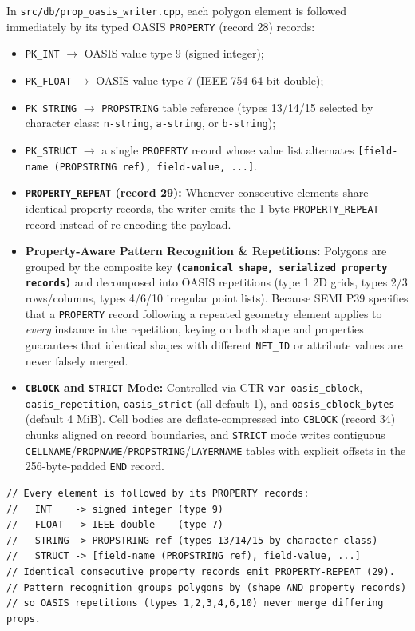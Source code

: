 In \texttt{src/db/prop\_oasis\_writer.cpp}, each polygon element is followed immediately by its typed OASIS \texttt{PROPERTY} (record 28) records:
\begin{itemize}
  \item \texttt{PK\_INT} $\to$ OASIS value type 9 (signed integer);
  \item \texttt{PK\_FLOAT} $\to$ OASIS value type 7 (IEEE-754 64-bit double);
  \item \texttt{PK\_STRING} $\to$ \texttt{PROPSTRING} table reference (types 13/14/15 selected by character class: \texttt{n-string}, \texttt{a-string}, or \texttt{b-string});
  \item \texttt{PK\_STRUCT} $\to$ a single \texttt{PROPERTY} record whose value list alternates \texttt{[field-name (PROPSTRING ref), field-value, ...]}.
  \item \textbf{\texttt{PROPERTY\_REPEAT} (record 29):} Whenever consecutive elements share identical property records, the writer emits the 1-byte \texttt{PROPERTY\_REPEAT} record instead of re-encoding the payload.
  \item \textbf{Property-Aware Pattern Recognition \& Repetitions:} Polygons are grouped by the composite key \textbf{\texttt{(canonical shape, serialized property records)}} and decomposed into OASIS repetitions (type 1 2D grids, types 2/3 rows/columns, types 4/6/10 irregular point lists). Because SEMI P39 specifies that a \texttt{PROPERTY} record following a repeated geometry element applies to \emph{every} instance in the repetition, keying on both shape and properties guarantees that identical shapes with different \texttt{NET\_ID} or attribute values are never falsely merged.
  \item \textbf{\texttt{CBLOCK} and \texttt{STRICT} Mode:} Controlled via CTR \texttt{var oasis\_cblock}, \texttt{oasis\_repetition}, \texttt{oasis\_strict} (all default 1), and \texttt{oasis\_cblock\_bytes} (default 4 MiB). Cell bodies are deflate-compressed into \texttt{CBLOCK} (record 34) chunks aligned on record boundaries, and \texttt{STRICT} mode writes contiguous \texttt{CELLNAME}/\texttt{PROPNAME}/\texttt{PROPSTRING}/\texttt{LAYERNAME} tables with explicit offsets in the 256-byte-padded \texttt{END} record.
\end{itemize}

\begin{lstlisting}[style=cppstyle,caption={OASIS \texttt{PROPERTY} type mapping and property-keyed repetition invariant in \texttt{src/db/prop\_oasis\_writer.cpp}.},label={lst:prop_oasis}]
// Every element is followed by its PROPERTY records:
//   INT    -> signed integer (type 9)
//   FLOAT  -> IEEE double    (type 7)
//   STRING -> PROPSTRING ref (types 13/14/15 by character class)
//   STRUCT -> [field-name (PROPSTRING ref), field-value, ...]
// Identical consecutive property records emit PROPERTY-REPEAT (29).
// Pattern recognition groups polygons by (shape AND property records)
// so OASIS repetitions (types 1,2,3,4,6,10) never merge differing props.
\end{lstlisting}

